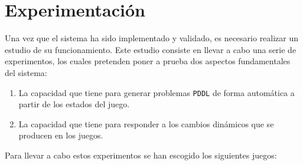 
\chapter{Experimentación}

Una vez que el sistema ha sido implementado y validado, es necesario realizar un estudio
de su funcionamiento. Este estudio consiste en llevar a cabo una serie de experimentos,
los cuales pretenden poner a prueba dos aspectos fundamentales del sistema:

\begin{enumerate}
    \item La capacidad que tiene para generar problemas \texttt{PDDL} de forma
    automática a partir de los estados del juego.
    \item La capacidad que tiene para responder a los cambios dinámicos que
    se producen en los juegos.
\end{enumerate}

Para llevar a cabo estos experimentos se han escogido los siguientes juegos:

